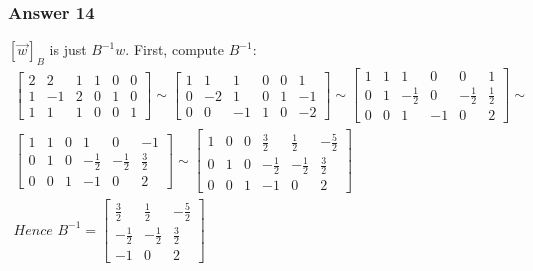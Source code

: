 \documentclass[11pt]{article}
\begin{document}
\subsubsection{Answer 14}
\label{sec-1-6-2}
$[\vec{w}]_B$ is just $B^{-1}w$.  First, compute $B^{-1}$:
\begin{align*}
  \begin{bmatrix}
    2 & 2  & 1 & 1 & 0 & 0 \\
    1 & -1 & 2 & 0 & 1 & 0 \\
    1 & 1  & 1 & 0 & 0 & 1
  \end{bmatrix} \sim
  \begin{bmatrix}
    1 & 1  & 1  & 0 & 0 & 1 \\
    0 & -2 & 1  & 0 & 1 & -1 \\
    0 & 0  & -1 & 1 & 0 & -2
  \end{bmatrix} \sim
  \begin{bmatrix}
    1 & 1 & 1            & 0  & 0            & 1 \\
    0 & 1 & -\frac{1}{2} & 0  & -\frac{1}{2} & \frac{1}{2} \\
    0 & 0 & 1            & -1 & 0            & 2
  \end{bmatrix} \sim \\
  \begin{bmatrix}
    1 & 1 & 0 & 1            & 0            & -1 \\
    0 & 1 & 0 & -\frac{1}{2} & -\frac{1}{2} & \frac{3}{2} \\
    0 & 0 & 1 & -1           & 0            & 2
  \end{bmatrix} \sim
  \begin{bmatrix}
    1 & 0 & 0 & \frac{3}{2}  & \frac{1}{2}  & -\frac{5}{2} \\
    0 & 1 & 0 & -\frac{1}{2} & -\frac{1}{2} & \frac{3}{2} \\
    0 & 0 & 1 & -1           & 0            & 2
  \end{bmatrix} \\
  \textit{Hence }B^{-1} = 
  \begin{bmatrix}
    \frac{3}{2}  & \frac{1}{2}  & -\frac{5}{2} \\
    -\frac{1}{2} & -\frac{1}{2} & \frac{3}{2} \\
    -1           & 0            & 2
  \end{bmatrix}
\end{align*}
\end{document}
